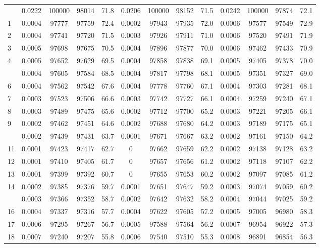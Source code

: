 \documentclass[
  14pt,
]{article}
\begin{document}
\begin{longtable}[t]{lcccccccccccc}
\endfoot
\bottomrule
\endlastfoot
0 & 0.0222 & 100000 & 98014 & 71.8 & 0.0206 & 100000 & 98152 & 71.5 & 0.0242 & 100000 & 97874 & 72.1\\
1 & 0.0004 & 97777 & 97759 & 72.4 & 0.0002 & 97943 & 97935 & 72.0 & 0.0006 & 97577 & 97549 & 72.9\\
2 & 0.0004 & 97741 & 97720 & 71.5 & 0.0003 & 97926 & 97911 & 71.0 & 0.0006 & 97520 & 97491 & 71.9\\
3 & 0.0005 & 97698 & 97675 & 70.5 & 0.0004 & 97896 & 97877 & 70.0 & 0.0006 & 97462 & 97433 & 70.9\\
4 & 0.0005 & 97652 & 97629 & 69.5 & 0.0004 & 97858 & 97838 & 69.1 & 0.0005 & 97405 & 97378 & 70.0\\
\addlinespace
5 & 0.0004 & 97605 & 97584 & 68.5 & 0.0004 & 97817 & 97798 & 68.1 & 0.0005 & 97351 & 97327 & 69.0\\
6 & 0.0004 & 97562 & 97542 & 67.6 & 0.0004 & 97778 & 97760 & 67.1 & 0.0004 & 97303 & 97281 & 68.1\\
7 & 0.0003 & 97523 & 97506 & 66.6 & 0.0003 & 97742 & 97727 & 66.1 & 0.0004 & 97259 & 97240 & 67.1\\
8 & 0.0003 & 97489 & 97475 & 65.6 & 0.0002 & 97712 & 97700 & 65.2 & 0.0003 & 97221 & 97205 & 66.1\\
9 & 0.0002 & 97462 & 97451 & 64.6 & 0.0002 & 97688 & 97680 & 64.2 & 0.0003 & 97189 & 97175 & 65.1\\
\addlinespace
10 & 0.0002 & 97439 & 97431 & 63.7 & 0.0001 & 97671 & 97667 & 63.2 & 0.0002 & 97161 & 97150 & 64.2\\
11 & 0.0001 & 97423 & 97417 & 62.7 & 0 & 97662 & 97659 & 62.2 & 0.0002 & 97138 & 97128 & 63.2\\
12 & 0.0001 & 97410 & 97405 & 61.7 & 0 & 97657 & 97656 & 61.2 & 0.0002 & 97118 & 97107 & 62.2\\
13 & 0.0001 & 97399 & 97392 & 60.7 & 0 & 97655 & 97653 & 60.2 & 0.0002 & 97097 & 97085 & 61.2\\
14 & 0.0002 & 97385 & 97376 & 59.7 & 0.0001 & 97651 & 97647 & 59.2 & 0.0003 & 97074 & 97059 & 60.2\\
\addlinespace
15 & 0.0003 & 97366 & 97352 & 58.7 & 0.0002 & 97642 & 97632 & 58.2 & 0.0004 & 97044 & 97025 & 59.2\\
16 & 0.0004 & 97337 & 97316 & 57.7 & 0.0004 & 97622 & 97605 & 57.2 & 0.0005 & 97005 & 96980 & 58.3\\
17 & 0.0006 & 97295 & 97267 & 56.7 & 0.0005 & 97588 & 97564 & 56.2 & 0.0007 & 96954 & 96922 & 57.3\\
18 & 0.0007 & 97240 & 97207 & 55.8 & 0.0006 & 97540 & 97510 & 55.3 & 0.0008 & 96891 & 96854 & 56.3\\

\end{longtable}
\end{document}
